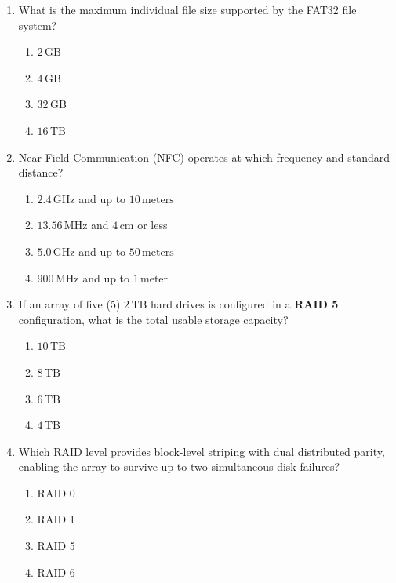 \begin{enumerate}[leftmargin=1.5em]
    \item What is the maximum individual file size supported by the FAT32 file system?
    \begin{enumerate}[label=(\alph*)]
        \item $2\,\text{GB}$
        \item $4\,\text{GB}$
        \item $32\,\text{GB}$
        \item $16\,\text{TB}$
    \end{enumerate}

    \item Near Field Communication (NFC) operates at which frequency and standard distance?
    \begin{enumerate}[label=(\alph*)]
        \item $2.4\,\text{GHz}$ and up to $10\,\text{meters}$
        \item $13.56\,\text{MHz}$ and $4\,\text{cm}$ or less
        \item $5.0\,\text{GHz}$ and up to $50\,\text{meters}$
        \item $900\,\text{MHz}$ and up to $1\,\text{meter}$
    \end{enumerate}

    \item If an array of five (5) $2\,\text{TB}$ hard drives is configured in a \textbf{RAID 5} configuration, what is the total usable storage capacity?
    \begin{enumerate}[label=(\alph*)]
        \item $10\,\text{TB}$
        \item $8\,\text{TB}$
        \item $6\,\text{TB}$
        \item $4\,\text{TB}$
    \end{enumerate}

    \item Which RAID level provides block-level striping with dual distributed parity, enabling the array to survive up to two simultaneous disk failures?
    \begin{enumerate}[label=(\alph*)]
        \item RAID 0
        \item RAID 1
        \item RAID 5
        \item RAID 6
    \end{enumerate}
\end{enumerate}

